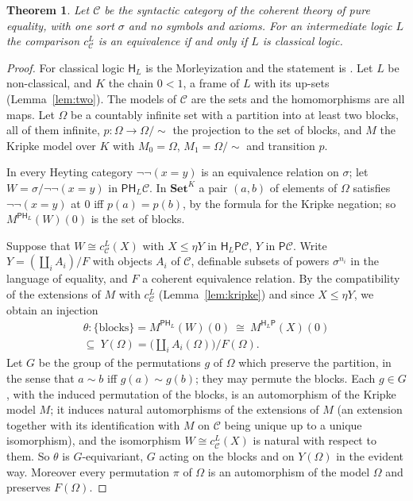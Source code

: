 \documentclass[11pt]{amsart}
\newtheorem{thm}{Theorem}[section]
\theoremstyle{definition}
\newcommand{\Set}{\mathbf{Set}}
\newcommand{\PP}{\mathsf P}
\newcommand{\HH}{\mathsf H}
\newcommand{\cC}{\mathcal C}
\begin{document}
\begin{thm}\label{thm:equality}
Let $\cC$ be the syntactic category of the coherent theory of pure
equality, with one sort $\sigma$ and no symbols and axioms. For an
intermediate logic $L$ the comparison $c^L_\cC$ is an equivalence if
and only if $L$ is classical logic.
\end{thm}
\begin{proof}
For classical logic $\HH_L$ is the Morleyization and the statement is
\cite[Ex.~6.5]{Morley}. Let $L$ be non-classical, and $K$ the chain
$0<1$, a frame of $L$ with its up-sets (Lemma~\ref{lem:two}). The
models of $\cC$ are the sets and the homomorphisms are all maps. Let
$\Omega$ be a countably infinite set with a partition into at least
two blocks, all of them infinite, $p\colon\Omega\to\Omega/{\sim}$ the projection to
the set of blocks, and $M$ the Kripke model over $K$ with $M_0=\Omega$,
$M_1=\Omega/{\sim}$ and transition $p$.

In every Heyting category $\neg\neg(x=y)$ is an equivalence relation on
$\sigma$; let $W=\sigma/\neg\neg(x=y)$ in $\PP\HH_L\cC$. In $\Set^K$ a
pair $(a,b)$ of elements of $\Omega$ satisfies $\neg\neg(x=y)$ at $0$
iff $p(a)=p(b)$, by the formula for the Kripke negation; so
$M^{\PP\HH_L}(W)(0)$ is the set of blocks.

Suppose that $W\cong c^L_\cC(X)$ with $X\le\eta Y$ in $\HH_L\PP\cC$,
$Y$ in $\PP\cC$. Write $Y=(\coprod_iA_i)/F$ with objects $A_i$ of
$\cC$, definable subsets of powers $\sigma^{n_i}$ in the language of
equality, and $F$ a coherent equivalence relation. By the
compatibility of the extensions of $M$ with $c^L_\cC$
(Lemma~\ref{lem:kripke}) and since $X\le\eta Y$, we obtain an injection
\begin{multline*}
\theta\colon\{\text{blocks}\}=M^{\PP\HH_L}(W)(0)\ \cong\ M^{\HH_L\PP}
(X)(0)\\ \subseteq\ Y(\Omega)=\Big(\coprod_iA_i(\Omega)\Big)/F(\Omega).
\end{multline*}
Let $G$ be the group of the permutations $g$ of $\Omega$ which preserve the
partition, in the sense that $a\sim b$ iff $g(a)\sim g(b)$; they may
permute the blocks. Each $g\in G$, with the induced permutation of the blocks,
is an automorphism of the Kripke model $M$; it induces natural
automorphisms of the extensions of $M$ (an extension together with its
identification with $M$ on $\cC$ being unique up to a unique
isomorphism), and the isomorphism $W\cong c^L_\cC(X)$ is natural
with respect to them. So $\theta$ is $G$-equivariant, $G$ acting on
the blocks and on $Y(\Omega)$ in the evident way. Moreover every
permutation $\pi$ of $\Omega$ is an automorphism of the model $\Omega$
and preserves $F(\Omega)$.


\end{proof}
\end{document}
